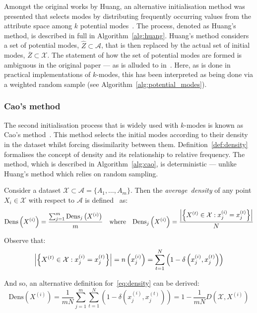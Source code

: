 Amongst the original works by Huang, an alternative initialisation method was
presented that selects modes by distributing frequently occurring values from
the attribute space among \(k\) potential modes~\cite{Huang1998}. The process,
denoted as Huang's method, is described in full in Algorithm~\ref{alg:huang}.
Huang's method considers a set of potential modes, \(\widehat Z \subset \mathcal
A\), that is then replaced by the actual set of initial modes, \(\overline Z
\subset \mathcal X\). The statement of how the set of potential modes are formed
is ambiguous in the original paper --- as is alluded to in~\cite{Jiang2016}.
Here, as is done in practical implementations of \(k\)-modes, this has been
interpreted as being done via a weighted random sample (see
Algorithm~\ref{alg:potential_modes}).




\subsubsection{Cao's method}\label{subsec:cao}

The second initialisation process that is widely used with \(k\)-modes is known
as Cao's method~\cite{Cao2009}. This method selects the initial modes according
to their density in the dataset whilst forcing dissimilarity between them.
Definition~\ref{def:density} formalises the concept of density and its
relationship to relative frequency. The method, which is described in
Algorithm~\ref{alg:cao}, is deterministic --- unlike Huang's method which relies
on random sampling.

\begin{definition}\label{def:density}	
    Consider a dataset
    \(\mathcal{X} \subset \mathcal{A} = \{A_1, \ldots, A_m\}\). Then the
    \emph{average~density} of any point \(X_i \in \mathcal{X}\) with respect to
    \(\mathcal{A}\) is defined~\cite{Cao2009} as:
    \begin{equation}\label{eq:density}
        \text{Dens}\left(X^{(i)}\right) = \frac{%
            \sum_{j=1}^m \text{Dens}_{j}\left(X^{(i)}\right)
        }{m}
        \quad \text{where} \quad
        \text{Dens}_{j}\left(X^{(i)}\right) = \frac{%
            \abs*{%
                \left\{X^{(t)} \in \mathcal{X} : x_j^{(i)} = x_j^{(t)}\right\}
            }
        }{N}
    \end{equation}

    Observe that:
    \[
        \abs*{\left\{X^{(t)} \in \mathcal{X} : x_j^{(i)} = x_j^{(t)}\right\}}%
        = n\left(x_j^{(i)}\right)%
        = \sum_{t=1}^N \left(1 - \delta\left(x_j^{(i)}, x_j^{(t)}\right)\right)
    \]

    And so, an alternative definition for~\eqref{eq:density} can be derived:
    \begin{equation}\label{eq:density-alt}
        \text{Dens}\left(X^{(i)}\right)
        = \frac{1}{mN} \sum_{j=1}^m \sum_{t=1}^N \left(%
            1 - \delta\left(x_j^{(i)}, x_j^{(t)}\right)
        \right)
        = 1 - \frac{1}{mN} D\left(\mathcal{X}, X^{(i)}\right)
    \end{equation}
\end{definition}


